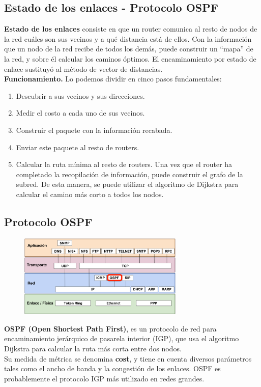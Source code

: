 \begin{onepage}
    \section{Estado de los enlaces - Protocolo OSPF}
    \textbf{Estado de los enlaces} consiste en que un router comunica al resto de nodos de la red cuáles son sus vecinos y a qué distancia está de ellos. Con la información que un nodo de la red recibe de todos los demás, puede construir un \enquote{mapa} de la red, y sobre él calcular los caminos óptimos. El encaminamiento por estado de enlace sustituyó al método de vector de distancias.\\
    
    \textbf{Funcionamiento.} Lo podemos dividir en cinco pasos fundamentales:
    \begin{enumerate}
        \item Descubrir a sus vecinos y sus direcciones.
        \item Medir el costo a cada uno de sus vecinos.
        \item Construir el paquete con la información recabada.
        \item Enviar este paquete al resto de routers.
        \item Calcular la ruta mínima al resto de routers. Una vez que el router ha completado la recopilación de información, puede construir el grafo de la subred. De esta manera, se puede utilizar el algoritmo de Dijkstra para calcular el camino más corto a todos los nodos.
    \end{enumerate}
    \subsection{Protocolo OSPF}
    \begin{figure}[H]
    \centering \includegraphics[width=0.7\textwidth]{img/OSPF.png}
    \end{figure}
    \textbf{OSPF (Open Shortest Path First)}, es un protocolo de red para encaminamiento jerárquico de pasarela interior (IGP), que usa el algoritmo Dijkstra para calcular la ruta más corta entre dos nodos.\\
    
    Su medida de métrica se denomina \textbf{cost}, y tiene en cuenta diversos parámetros tales como el ancho de banda y la congestión de los enlaces. OSPF es probablemente el protocolo IGP más utilizado en redes grandes.
\end{onepage}
